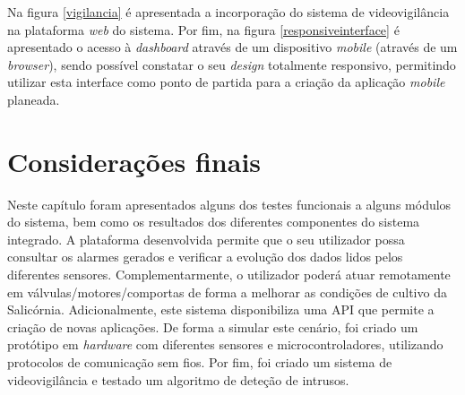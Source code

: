 Na figura \ref{vigilancia} é apresentada a incorporação do sistema de videovigilância na plataforma \textit{web} do sistema. Por fim, na figura \ref{responsiveinterface} é apresentado o acesso à \textit{dashboard} através de um dispositivo \textit{mobile} (através de um \textit{browser}), sendo possível constatar o seu \textit{design} totalmente responsivo, permitindo utilizar esta interface como ponto de partida para a criação da aplicação \textit{mobile} planeada. 




\section{Considerações finais}



Neste capítulo foram apresentados alguns dos testes funcionais a alguns módulos do sistema, bem como os resultados dos diferentes componentes do sistema integrado.  A plataforma desenvolvida permite que o seu utilizador possa consultar os alarmes gerados e verificar a evolução dos dados lidos pelos diferentes sensores. Complementarmente, o utilizador poderá atuar remotamente em válvulas/motores/comportas de forma a melhorar as condições de cultivo da Salicórnia. Adicionalmente, este sistema disponibiliza uma API que permite a criação de novas aplicações. De forma a simular este cenário, foi criado um protótipo em \textit{hardware} com diferentes sensores e microcontroladores, utilizando protocolos de comunicação sem fios. Por fim, foi criado um sistema de videovigilância e testado um algoritmo de deteção de intrusos. 


